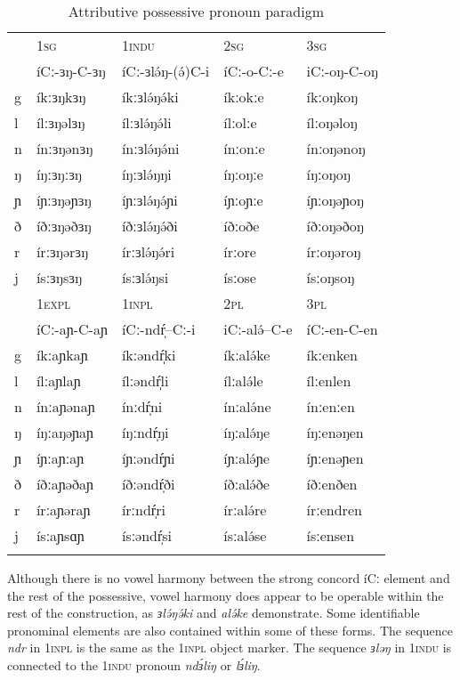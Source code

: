 \begin{table}
\begin{tabular}[t]{lllll}
\lsptoprule
	&	1\textsc{sg}			&	1\textsc{indu}		&	2\textsc{sg}			&	3\textsc{sg} \\
	& 	íCː-ɜŋ-C-ɜŋ	&	íCː-ɜlə́ŋ-(ə́)C-i & íCː-o-Cː-e 	&	iCː-oŋ-C-oŋ  \\
\midrule
	g&	íkːɜŋkɜŋ 	&	íkːɜlə́ŋə́ki	&	íkːokːe	&	íkːoŋkoŋ\\
	l&	ílːɜŋəlɜŋ 	&	ílːɜlə́ŋə́li	&	ílːolːe	&	ílːoŋəloŋ\\
	n&	ínːɜŋənɜŋ 	&	ínːɜlə́ŋə́ni	&	ínːonːe	&	ínːoŋənoŋ\\
	ŋ&	íŋːɜŋːɜŋ 	&	íŋːɜlə́ŋŋi	&	íŋːoŋːe	&	íŋːoŋoŋ	\\
	ɲ&	íɲːɜŋəɲɜŋ	&	íɲːɜlə́ŋə́ɲi  	&	íɲːoɲːe	&	íɲːoŋəɲoŋ	\\
	ð&	íðːɜŋəðɜŋ 	&	íðːɜlə́ŋə́ði 	&	íðːoðe	&	íðːoŋəðoŋ	\\
	r&	írːɜŋərɜŋ 	&	írːɜlə́ŋə́ri 	&	írːore	&	írːoŋəroŋ	\\
	j&	ísːɜŋsɜŋ 	&	ísːɜlə́ŋsi	&	ísːose	&	ísːoŋsoŋ\\
\lsptoprule
&		1\textsc{expl}		&1\textsc{inpl}&		\textsc{2pl}&		\textsc{3pl} \\
&	íCː-aɲ-C-aɲ	&íCː-ndŕ̩--Cː-i&	iCː-alə́--C-e&	íCː-en-C-en \\
\midrule
	g&	íkːaɲkaɲ &	íkːəndŕ̩ki	&íkːalə́ke	&íkːenken\\
	l&	ílːaɲlaɲ & 	ílːəndŕ̩li  	&ílːalə́le	&	ílːenlen\\
n&	ínːaɲənaɲ &	ínːdŕ̩ni		&ínːalə́ne	&ínːenːen\\
	ŋ&	íŋːaŋəɲaɲ 	&íŋːndŕ̩ŋi	&íŋːalə́ŋe&	íŋːenəŋen\\
	ɲ&	íɲːaɲːaɲ 	&íɲːəndŕ̩ɲi	&íɲːalə́ɲe&	íɲːenəɲen\\
	ð&	íðːaɲəðaɲ &	íðːəndŕ̩ði	&íðːalə́ðe	&íðːenðen\\
	r&	írːaɲəraɲ &	írːndŕ̩ri	&	írːalə́re&		írːendren\\
	j&	ísːaɲsɑɲ& 	ísːəndŕ̩si	&ísːalə́se	&	ísːensen\\
\lspbottomrule
		\end{tabular}
		  \caption{Attributive possessive pronoun paradigm}
  \label{tab:ch7:4}
\end{table} %

Although there is no vowel harmony between the strong concord íCː element and the rest of the possessive, vowel harmony does appear to be operable within the rest of the construction, as \textit{ɜlə́ŋə́ki} and \textit{alə́ke} demonstrate. Some identifiable pronominal elements are also contained within some of these forms. The sequence \textit{ndr} in 1\textsc{inpl} is the same as the 1\textsc{inpl} object marker. The sequence \textit{ɜləŋ} in 1\textsc{indu} is connected to the 1\textsc{indu} pronoun \textit{ndɜ́liŋ} or \textit{lɜ́liŋ}.

